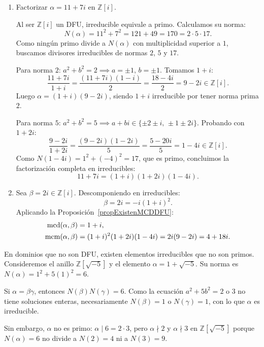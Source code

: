 \begin{ejemplo}
    \leavevmode
    \begin{enumerate}[label=\arabic*)]
        \item Factorizar $\alpha = 11 + 7i$ en $\mathbb{Z}[i]$.

        Al ser $\mathbb{Z}[i]$ un DFU, irreducible equivale a primo. Calculamos su norma:
        \[
            N(\alpha) = 11^2 + 7^2 = 121 + 49 = 170 = 2 \cdot 5 \cdot 17.
        \]
        Como ningún primo divide a $N(\alpha)$ con multiplicidad superior a $1$, buscamos divisores irreducibles de normas $2$, $5$ y $17$.

        Para norma $2$: $a^2 + b^2 = 2 \implies a = \pm 1, \, b = \pm 1$. Tomamos $1 + i$:
        \[
            \frac{11 + 7i}{1 + i} = \frac{(11 + 7i)(1 - i)}{2} = \frac{18 - 4i}{2} = 9 - 2i \in \mathbb{Z}[i].
        \]
        Luego $\alpha = (1 + i)(9 - 2i)$, siendo $1 + i$ irreducible por tener norma prima $2$.

        Para norma $5$: $a^2 + b^2 = 5 \implies a + bi \in \{\pm 2 \pm i, \, \pm 1 \pm 2i\}$. Probando con $1 + 2i$:
        \[
            \frac{9 - 2i}{1 + 2i} = \frac{(9 - 2i)(1 - 2i)}{5} = \frac{5 - 20i}{5} = 1 - 4i \in \mathbb{Z}[i].
        \]
        Como $N(1 - 4i) = 1^2 + (-4)^2 = 17$, que es primo, concluimos la factorización completa en irreducibles:
        \[
            11 + 7i = (1 + i)(1 + 2i)(1 - 4i).
        \]

        \item Sea $\beta = 2i \in \mathbb{Z}[i]$. Descomponiendo en irreducibles:
        \[
            \beta = 2i = -i (1+i)^2.
        \]
        Aplicando la Proposición~\ref{propExistenMCDDFU}:
        \begin{align*}
            \operatorname{mcd}(\alpha, \beta) &= 1 + i, \\
            \operatorname{mcm}(\alpha, \beta) &= (1 + i)^2 (1 + 2i)(1 - 4i) = 2i(9 - 2i) = 4 + 18i.
        \end{align*}
    \end{enumerate}
\end{ejemplo}

\begin{ejemplo}
    En dominios que no son DFU, existen elementos irreducibles que no son primos. Consideremos el anillo $\mathbb{Z}[\sqrt{-5}]$ y el elemento $\alpha = 1 + \sqrt{-5}$. Su norma es $N(\alpha) = 1^2 + 5(1)^2 = 6$. 

    Si $\alpha = \beta \gamma$, entonces $N(\beta) N(\gamma) = 6$. Como la ecuación $a^2 + 5b^2 = 2$ o $3$ no tiene soluciones enteras, necesariamente $N(\beta) = 1$ o $N(\gamma) = 1$, con lo que $\alpha$ es irreducible.

    Sin embargo, $\alpha$ no es primo: $\alpha \mid 6 = 2 \cdot 3$, pero $\alpha \nmid 2$ y $\alpha \nmid 3$ en $\mathbb{Z}[\sqrt{-5}]$ porque $N(\alpha) = 6$ no divide a $N(2) = 4$ ni a $N(3) = 9$.
\end{ejemplo}

